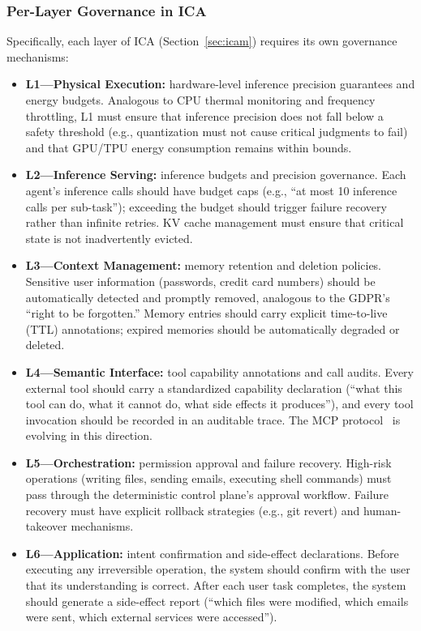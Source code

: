 \subsubsection{Per-Layer Governance in ICA}
Specifically, each layer of ICA (Section~\ref{sec:icam}) requires its own governance mechanisms:

\begin{itemize}[nosep]
\item \textbf{L1---Physical Execution:} hardware-level inference precision guarantees and energy budgets.
Analogous to CPU thermal monitoring and frequency throttling, L1 must ensure that inference precision does not fall below a safety threshold (e.g., quantization must not cause critical judgments to fail) and that GPU/TPU energy consumption remains within bounds.

\item \textbf{L2---Inference Serving:} inference budgets and precision governance.
Each agent's inference calls should have budget caps (e.g., ``at most 10 inference calls per sub-task''); exceeding the budget should trigger failure recovery rather than infinite retries.
KV cache management must ensure that critical state is not inadvertently evicted.

\item \textbf{L3---Context Management:} memory retention and deletion policies.
Sensitive user information (passwords, credit card numbers) should be automatically detected and promptly removed, analogous to the GDPR's ``right to be forgotten.''
Memory entries should carry explicit time-to-live (TTL) annotations; expired memories should be automatically degraded or deleted.

\item \textbf{L4---Semantic Interface:} tool capability annotations and call audits.
Every external tool should carry a standardized capability declaration (``what this tool can do, what it cannot do, what side effects it produces''), and every tool invocation should be recorded in an auditable trace.
The MCP protocol~\cite{mcp_intro_2026} is evolving in this direction.

\item \textbf{L5---Orchestration:} permission approval and failure recovery.
High-risk operations (writing files, sending emails, executing shell commands) must pass through the deterministic control plane's approval workflow.
Failure recovery must have explicit rollback strategies (e.g., git revert) and human-takeover mechanisms.

\item \textbf{L6---Application:} intent confirmation and side-effect declarations.
Before executing any irreversible operation, the system should confirm with the user that its understanding is correct.
After each user task completes, the system should generate a side-effect report (``which files were modified, which emails were sent, which external services were accessed'').
\end{itemize}

